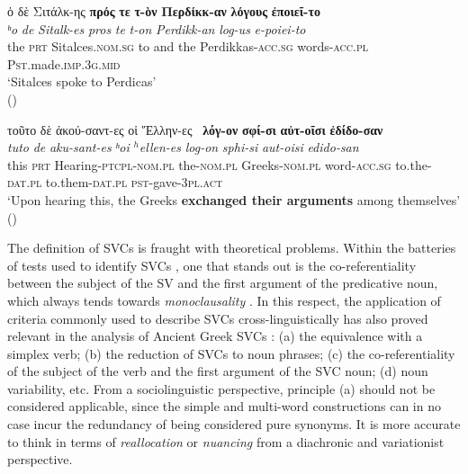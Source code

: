 \documentclass[output=paper,colorlinks,citecolor=brown]{langscibook}
\begin{document}

\ea\label{ex:vc:2}

\ea\label{ex:vc:2a}

\glll ὁ δὲ Σιτάλκ-ης \textbf{πρός} \textbf{τε} \textbf{τ-ὸν} \textbf{Περδίκκ-αν} \textbf{λόγους} \textbf{ἐποιεῖ-το}\\
 \textit{ʰo} \textit{de} \textit{Sitalk-es} \textit{pros} \textit{te} \textit{t-on} \textit{Perdikk-an} \textit{log-us} \textit{e-poiei-to}\\
the \textsc{prt} Sitalces.\textsc{nom.sg} to and the Perdikkas-\textsc{acc.sg} words-\textsc{acc.pl} \textsc{Pst.}made.\textsc{imp.3g.mid}\\
\glt `Sitalces spoke to Perdicas' \\
\hspace*{\fill}()

\ex\label{ex:vc:2b}

\glll τοῦτο δὲ ἀκού-σαντ-ες οἱ Ἕλλην-ες~ \textbf{λόγ-ον} \textbf{σφί-σι} \textbf{αὐτ-οῖσι} \textbf{ἐδίδο-σαν}\\
 \textit{tuto} \textit{de} \textit{aku-sant-es} \textit{ʰoi} \textit{$^h$ellen-es} \textit{log-on} \textit{sphi-si} \textit{aut-oisi} \textit{edido-san}\\
this \textsc{prt} Hearing-\textsc{ptcpl-nom.pl} the-\textsc{nom.pl}
Greeks-\textsc{nom.pl} word-\textsc{acc.sg} to.the-\textsc{dat.pl} to.them\textsc{-dat.pl} \textsc{pst-}gave-3\textsc{pl.act}\\
\glt `Upon hearing this, the Greeks \textbf{exchanged their arguments} among themselves' \\
\hspace*{\fill}()

\z

\z

The definition of SVCs is fraught with theoretical problems. Within the batteries of tests
used to identify SVCs \parencite{LangerStefan-2004588}, one that stands out is the
co-referentiality between the subject of the SV and the first argument of the predicative
noun, which always tends towards \emph{monoclausality} \citep{ButtMiriam-2010672}. In this respect, the
application of criteria commonly used to describe SVCs cross-linguistically has also
proved relevant in the analysis of Ancient Greek SVCs
\parencite{JiménezLópezMaríaDolores-2016731}: (a) the equivalence with a simplex verb; (b)
the reduction of SVCs to noun phrases; (c) the co-referentiality of the subject of the
verb and the first argument of the SVC noun; (d) noun variability, etc. From a
sociolinguistic perspective, principle (a) should not be considered applicable, since the
simple and multi-word constructions can in no case incur the redundancy of being
considered pure synonyms. It is more accurate to think in terms of \emph{reallocation} or
\emph{nuancing} from a diachronic and variationist perspective.
\end{document}
